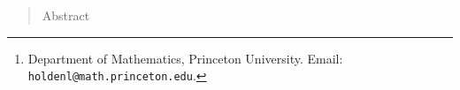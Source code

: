 \documentclass[11pt]{article}
\begin{document}
 
\title{}


\author{Holden Lee\thanks{Department of Mathematics,
Princeton University.
Email: \texttt{holdenl@math.princeton.edu}. }}


\date{}
\maketitle


\begin{abstract}
Abstract
\end{abstract} 
\end{document}

